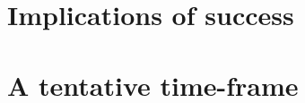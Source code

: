 \documentclass[letterpaper]{article}
\begin{document}
\section{Implications of success}
\section{A tentative time-frame}


\printindex
\end{document}
